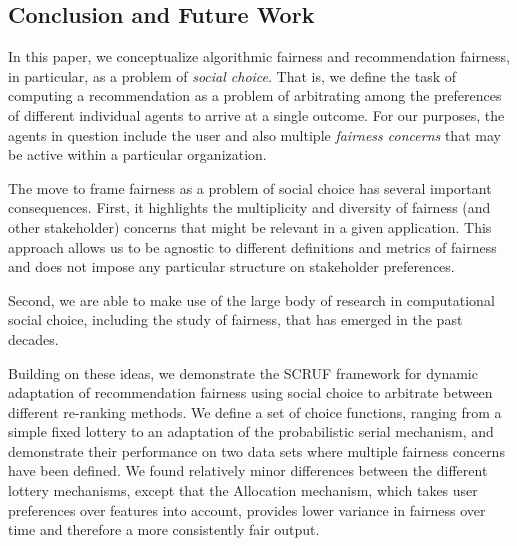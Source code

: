 \subsection{Conclusion and Future Work}
In this paper, we conceptualize algorithmic fairness and recommendation fairness, in particular, as a problem of \textit{social choice}. That is, we define the task of computing a recommendation as a problem of arbitrating among the preferences of different individual agents to arrive at a single outcome. For our purposes, the agents in question include the user and also multiple \textit{fairness concerns} that may be active within a particular organization. 

The move to frame fairness as a problem of social choice has several important consequences. First, it highlights the multiplicity and diversity of fairness (and other stakeholder) concerns that might be relevant in a given application. This approach allows us to be agnostic to different definitions and metrics of fairness and does not impose any particular structure on stakeholder preferences.

Second, we are able to make use of the large body of research in computational social choice, including the study of fairness, that has emerged in the past decades. 

Building on these ideas, we demonstrate the SCRUF framework for dynamic adaptation of recommendation fairness using social choice to arbitrate between different re-ranking methods. We define a set of choice functions, ranging from a simple fixed lottery to an adaptation of the probabilistic serial mechanism, and demonstrate their performance on two data sets where multiple fairness concerns have been defined. We found relatively minor differences between the different lottery mechanisms, except that the Allocation mechanism, which takes user preferences over features into account, provides lower variance in fairness over time and therefore a more consistently fair output.

